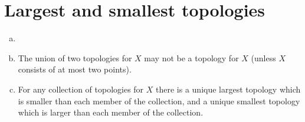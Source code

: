 \section{Largest and smallest topologies}
\label{exercises:01-A}

\begin{enumerate}[(a)]
  \item
  \item
    The union of two topologies for \(X\) may not be a topology for \(X\)
    (unless \(X\) consists of at most two points).
  \item
    For any collection of topologies for \(X\) there is a unique largest
    topology which is smaller than each member of the collection, and a unique
    smallest topology which is larger than each member of the collection.
\end{enumerate}
